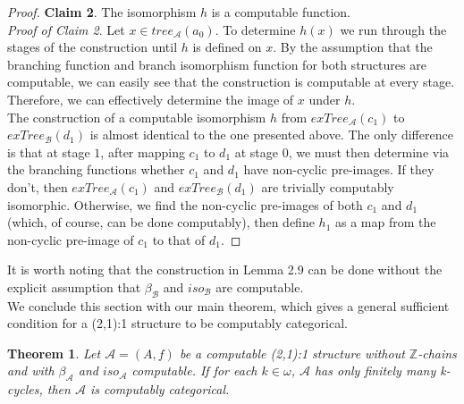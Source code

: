 \documentclass[12pt]{article}
\newtheorem{thm}{Theorem}[section]
\begin{document}
\begin{proof}
\textbf{Claim 2}. The isomorphism $h$ is a computable function.\\

\emph{Proof of Claim 2}. Let $x \in tree_\mathcal{A} (a_0)$. To determine $h(x)$ we run through the stages of the construction until $h$ is defined on $x$. By the assumption that the branching function and branch isomorphism function for both structures are computable, we can easily see that the construction is computable at every stage. Therefore, we can effectively determine the image of $x$ under $h$.\\

The construction of a computable isomorphism $h$ from $exTree_\mathcal{A} (c_1)$ to $exTree_\mathcal{B} (d_1)$ is almost identical to the one presented above. The only difference is that at stage $1$, after mapping $c_1$ to $d_1$ at stage $0$, we must then determine via the branching functions whether $c_1$ and $d_1$ have non-cyclic pre-images. If they don't, then $exTree_\mathcal{A} (c_1)$ and $exTree_\mathcal{B} (d_1)$ are trivially computably isomorphic. Otherwise, we find the non-cyclic pre-images of both $c_1$ and $d_1$ (which, of course, can be done computably), then define $h_1$ as a map from the non-cyclic pre-image of $c_1$ to that of $d_1$.
\end{proof}

It is worth noting that the construction in Lemma 2.9 can be done without the explicit assumption that $\beta_\mathcal{B}$ and $iso_\mathcal{B}$ are computable. \\

We conclude this section with our main theorem, which gives a general sufficient condition for a (2,1):1 structure to be computably categorical.

\begin{thm}
Let $\mathcal{A}=(A,f)$ be a computable (2,1):1 structure without $\mathbb{Z}$-chains and with $\beta_{\mathcal{A}}$ and $iso_{\mathcal{A}}$ computable. If for each $k \in \omega$, $\mathcal{A}$ has only finitely many k-cycles, then $\mathcal{A}$ is computably categorical.
\end{thm}
\end{document}
